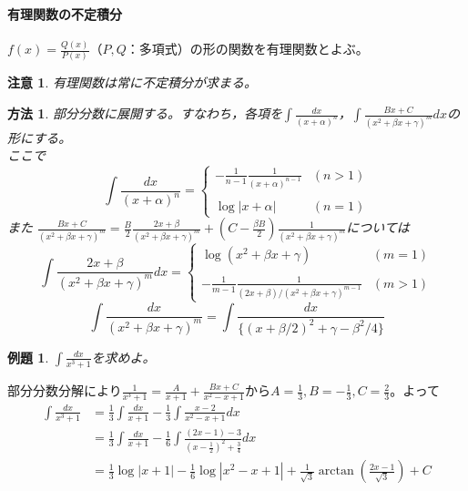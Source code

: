 \documentclass[dvipdfmx,a4j,10pt]{jsarticle}
\makeatletter
\theoremstyle{mystyle1}
\newtheorem{ex}[dfn]{例題}
\theoremstyle{mystyle2}
\newtheorem{ans}{解答}
\newtheorem{note}{注意}
\newtheorem{way*}{方法}
\renewenvironment{ans}[1][解答]{\par
  \pushQED{\qed}%
  \normalfont
  \topsep6\p@\@plus6\p@ \trivlist
  \item[\hskip\labelsep{\bfseries\sffamily #1}]\ignorespaces
}{%
  \popQED\endtrivlist\@endpefalse
}
\makeatother
\begin{document}
\newpage

\paragraph{有理関数の不定積分}

$\displaystyle f(x)=\frac{Q(x)}{P(x)}$（$P,Q$：多項式）の形の関数を有理関数とよぶ。

\begin{note}
有理関数は常に不定積分が求まる。
\end{note}

\begin{way*}
    部分分数に展開する。すなわち，各項を$\displaystyle\int\frac{dx}{(x+\alpha)^n}$，$\displaystyle\int\frac{Bx+C}{(x^2+\beta x+\gamma)^m}dx$の形にする。\\
    ここで
    \[
    \int\frac{dx}{(x+\alpha)^n}=
    \begin{cases}
    \displaystyle-\frac{1}{n-1}\frac{1}{(x+\alpha)^{n-1}} & (n>1)\\
    \\
    \log{|x+\alpha|} & (n=1)
    \end{cases}
    \]
    また
    $\displaystyle\frac{Bx+C}{(x^2+\beta x+\gamma)^m}=\frac{B}{2}\frac{2x+\beta}{(x^2+\beta x+\gamma)^m}+\left(C-\frac{\beta B}{2}\right)\frac{1}{(x^2+\beta x+\gamma)^m}$については
    \[
    \int \frac{2x+\beta}{(x^2+\beta x+\gamma)^m}dx =
    \begin{cases}
    \displaystyle\log{(x^2+\beta x+\gamma)} & (m=1)\\
    \\
    \displaystyle-\frac{1}{m-1}\frac{1}{(2x+\beta)/(x^2+\beta x+\gamma)^{m-1}} & (m>1)
    \end{cases}
    \]
    \[
    \int\frac{dx}{(x^2+\beta x+\gamma)^m}=\int\frac{dx}{\{(x+\beta/2)^2+\gamma-\beta^2/4\}}
    \]
\end{way*}

\begin{shaded}
\begin{ex}\label{ex9.4}
$\displaystyle\int\frac{dx}{x^3+1}$を求めよ。
\end{ex}
\end{shaded}

\begin{ans}[解答\ref{ex9.4}]
部分分数分解により$\displaystyle\frac{1}{x^3+1}=\frac{A}{x+1}+\frac{Bx+C}{x^2-x+1}$から$\displaystyle A=\frac{1}{3},B=-\frac{1}{3},C=\frac{2}{3}$。よって
\[
\begin{split}
\int\frac{dx}{x^3+1}&=\frac{1}{3}\int\frac{dx}{x+1}-\frac{1}{3}\int\frac{x-2}{x^2-x+1}dx\\
&=\frac{1}{3}\int\frac{dx}{x+1}-\frac{1}{6}\int\frac{(2x-1)-3}{\left(x-\frac{1}{2}\right)^2+\frac{3}{4}}dx\\
&=\frac{1}{3}\log{|x+1|}-\frac{1}{6}\log{|x^2-x+1|}+\frac{1}{\sqrt{3}}\arctan{\left(\frac{2x-1}{\sqrt{3}}\right)}+C
\end{split}
\]
\end{ans}
\end{document}
